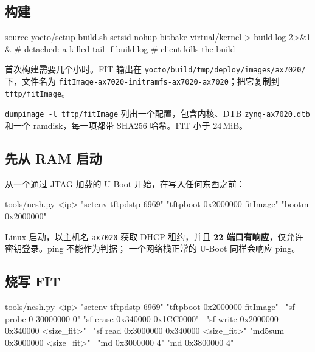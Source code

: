 \documentclass[11pt,a4paper,oneside]{article}
\newcommand{\file}[1]{{\color{bluemid}\nolinkurl{#1}}}
\newcommand{\cmd}[1]{\texttt{#1}}
\begin{document}
\subsection{构建}

\begin{shell}
source yocto/setup-build.sh
setsid nohup bitbake virtual/kernel > build.log 2>&1 &     # detached: a killed
tail -f build.log                                          # client kills the build
\end{shell}

首次构建需要几个小时。FIT 输出在
\file{yocto/build/tmp/deploy/images/ax7020/} 下，文件名为
\file{fitImage-ax7020-initramfs-ax7020-ax7020}；把它复制到 \file{tftp/fitImage}。

\begin{checkpoint}
\cmd{dumpimage -l tftp/fitImage} 列出一个配置，包含内核、DTB
\cmd{zynq-ax7020.dtb} 和一个 ramdisk，每一项都带 SHA256 哈希。FIT 小于 24\,MiB。
\end{checkpoint}

\subsection{先从 RAM 启动}

从一个通过 JTAG 加载的 U-Boot 开始，在写入任何东西之前：

\begin{shell}
tools/ncsh.py <ip> "setenv tftpdstp 6969" "tftpboot 0x2000000 fitImage" "bootm 0x2000000"
\end{shell}

\begin{checkpoint}
Linux 启动，以主机名 \cmd{ax7020} 获取 DHCP 租约，并且
\textbf{22 端口有响应}，仅允许密钥登录。ping 不能作为判据；
一个网络栈正常的 U-Boot 同样会响应 ping。
\end{checkpoint}

\subsection{烧写 FIT}

\begin{shell}
tools/ncsh.py <ip> "setenv tftpdstp 6969" "tftpboot 0x2000000 fitImage" \
  "sf probe 0 30000000 0" "sf erase 0x340000 0x1CC0000" \
  "sf write 0x2000000 0x340000 <size_fit>" \
  "sf read 0x3000000 0x340000 <size_fit>" "md5sum 0x3000000 <size_fit>" \
  "md 0x3000000 4" "md 0x3800000 4"
\end{shell}
\end{document}
